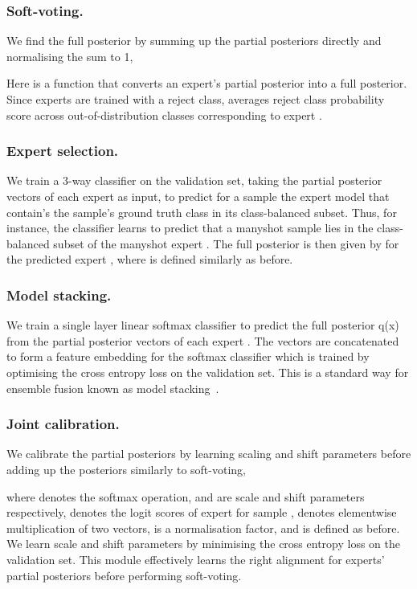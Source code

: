 \documentclass[runningheads]{llncs}
\begin{document}
\subsubsection{Soft-voting.} We find the full posterior by summing up the partial posteriors directly and normalising the sum to 1, 
\begin{center}
        
\end{center}
Here  is a function that converts an expert's partial posterior into a full posterior. Since experts are trained with a reject class,  averages reject class probability score across out-of-distribution classes corresponding to expert .

\subsubsection{Expert selection.} We train a 3-way classifier on the validation set, taking the partial posterior vectors  of each expert  as input, to predict for a sample  the expert model  that contain's the sample's ground truth class in its class-balanced subset. Thus, for instance, the classifier learns to predict that a manyshot sample lies in the class-balanced subset of the manyshot expert . The full posterior  is then given by  for the predicted expert , where  is defined similarly as before.    
\subsubsection{Model stacking.} We train a single layer linear softmax classifier to predict the full posterior q(x) from the partial posterior vectors  of each expert . The vectors  are concatenated to form a feature embedding for the softmax classifier which is trained by optimising the cross entropy loss on the validation set. This is a standard way for ensemble fusion known as model stacking~\cite{wolpert1992stacked}. 
\subsubsection{Joint calibration.} We calibrate the partial posteriors  by learning scaling and shift parameters before adding up the posteriors similarly to soft-voting,        
\begin{center}
        
\end{center}
where  denotes the softmax operation,  and  are scale and shift parameters respectively,   denotes the logit scores of expert  for sample ,  denotes elementwise multiplication of two vectors,  is a normalisation factor, and  is defined as before. We learn scale and shift parameters by minimising the cross entropy loss on the validation set. This module effectively learns the right alignment for experts' partial posteriors before performing soft-voting.
\end{document}
